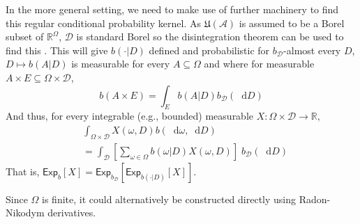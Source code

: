 \documentclass[a4paper]{article}
\newcommand\A{\mathcal{A}}
\newcommand\Exp{\mathsf{Exp}}
\newcommand\U{\mathfrak{U}} %
\newcommand{\Decs}{\mathcal{D}}
\newcommand\s{\mathsf{s}}
\newcommand{\n}{\mathsf{n}}
\renewcommand{\nu}{\n}
\renewcommand{\Re}{\mathbb{R}}
\renewcommand{\color}[1]{}
\newenvironment{colored}[1]{\leavevmode\color{#1}}{}
\newcommand*\diff{\mathop{}\!\mathrm{d}}
\newenvironment{CCM rewritten}
{\begingroup\color{blue}} %
{\endgroup}              %
\begin{document}
\begin{colored}{violet}
In the more general setting, we need to make use of further machinery to find this regular conditional probability kernel. 
As $\U(\A)$ is assumed to be a Borel subset of $\Re^\Omega$, $\Decs$ is standard Borel so the disintegration theorem can be used to find this \citep[Theorem 3.4]{kallenberg1997foundations}. This will give $b(\cdot|D)$ defined and probabilistic for $b_\Decs$-almost every $D$, $D\mapsto b(A|D)$ is measurable for every $A\subseteq\Omega$ and where for measurable $A\times E\subseteq\Omega\times\Decs$, 
\[
b(A\times E)=\int_E b(A|D) b_\Decs(\diff D)
\]
And thus,  for every integrable (e.g., bounded) measurable $X:\Omega\times\Decs\to\Re$, \begin{align}
	&\int_{\Omega\times \Decs} X(\omega,D) b(\diff \omega, \diff D)\\
	&=\int_\Decs \left[\sum_{\omega\in\Omega} b(\omega|D)X(\omega,D)\right]\;b_\Decs(\diff D)
\end{align}
That is, $\Exp_b[X]=\Exp_{b_\Decs}[\Exp_{b(\cdot|D)}[X]]$.

Since $\Omega$ is finite, it could alternatively be constructed directly using Radon-Nikodym derivatives. 




%
%
%
%
%
%
%
%
%
%
%



\end{colored}
\end{document}
